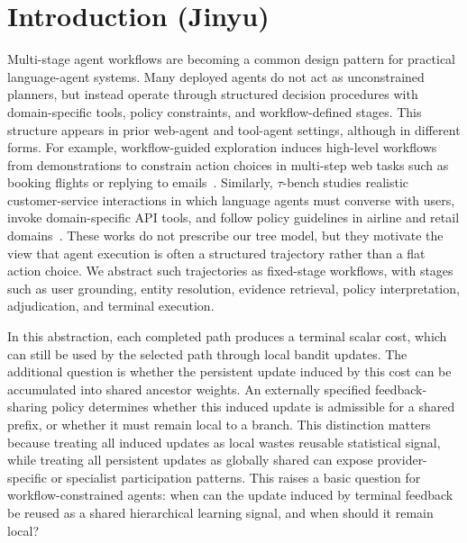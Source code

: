 \section{Introduction (Jinyu)}

Multi-stage agent workflows are becoming a common design pattern for practical language-agent systems.
Many deployed agents do not act as unconstrained planners, but instead operate through structured decision procedures with domain-specific tools, policy constraints, and workflow-defined stages.
This structure appears in prior web-agent and tool-agent settings, although in different forms.
For example, workflow-guided exploration induces high-level workflows from demonstrations to constrain action choices in multi-step web tasks such as booking flights or replying to emails~\cite{liu2018workflow}.
Similarly, $\tau$-bench studies realistic customer-service interactions in which language agents must converse with users, invoke domain-specific API tools, and follow policy guidelines in airline and retail domains~\cite{yao2024tau}.
These works do not prescribe our tree model, but they motivate the view that agent execution is often a structured trajectory rather than a flat action choice.
We abstract such trajectories as fixed-stage workflows, with stages such as user grounding, entity resolution, evidence retrieval, policy interpretation, adjudication, and terminal execution.

In this abstraction, each completed path produces a terminal scalar cost, which can still be used by the selected path through local bandit updates.
The additional question is whether the persistent update induced by this cost can be accumulated into shared ancestor weights.
An externally specified feedback-sharing policy determines whether this induced update is admissible for a shared prefix, or whether it must remain local to a branch.
This distinction matters because treating all induced updates as local wastes reusable statistical signal, while treating all persistent updates as globally shared can expose provider-specific or specialist participation patterns.
This raises a basic question for workflow-constrained agents: when can the update induced by terminal feedback be reused as a shared hierarchical learning signal, and when should it remain local?

